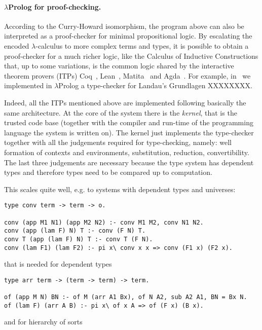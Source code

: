 \documentclass{easychair}
\begin{document}
\paragraph{$\lambda$Prolog for proof-checking.}

According to the Curry-Howard isomorphism, the program above can also
be interpreted as a proof-checker for minimal propositional logic. By
escalating the encoded $\lambda$-calculus to more complex terms and
types, it is possible to obtain a proof-checker for a much richer
logic, like the Calculus of Inductive Constructions that, up to some
variations, is the common logic shared by the interactive theorem
provers (ITPs) Coq~\cite{}, Lean~\cite{}, Matita~\cite{} and
Agda~\cite{}. For example, in~\cite{us} we implemented in
$\lambda$Prolog a type-checker for Landau's Grundlagen XXXXXXXX.

Indeed, all the ITPs mentioned above are implemented following
basically the same architecture. At the core of the system there is
the \emph{kernel}, that is the trusted code base (together with the
compiler and run-time of the programming language the system is
written on). The kernel just implements the type-checker together with
all the judgements required for type-checking, namely: well formation
of contexts and environments, substitution, reduction, convertibility.
The last three judgements are necessary because the type system has
dependent types and therefore types need to be compared up to
computation.

This scales quite well, e.g. to systems with dependent types and
universes:

\begin{verbatim}
type conv term -> term -> o.

conv (app M1 N1) (app M2 N2) :- conv M1 M2, conv N1 N2.
conv (app (lam F) N) T :- conv (F N) T.
conv T (app (lam F) N) T :- conv T (F N).
conv (lam F1) (lam F2) :- pi x\ conv x x => conv (F1 x) (F2 x).
\end{verbatim}

\noindent
that is needed for dependent types

\begin{verbatim}
type arr term -> (term -> term) -> term.

of (app M N) BN :- of M (arr A1 Bx), of N A2, sub A2 A1, BN = Bx N.
of (lam F) (arr A B) :- pi x\ of x A => of (F x) (B x).
\end{verbatim}

\noindent
and for hierarchy of sorts
\end{document}
